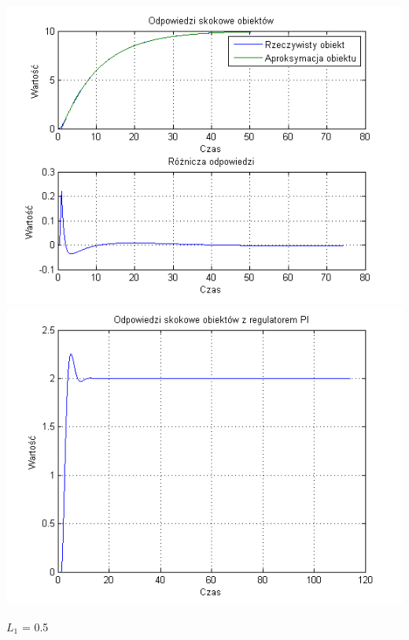 \documentclass[10pt,a4paper]{article}
\begin{document}
\begin{center}
\includegraphics[scale=1]{images/jeden/skrypt_215.png}\\
\includegraphics[scale=1]{images/jeden/skrypt_216.png}\\
\end{center}
\newpage
$L_1$ = 0.5
\end{document}
